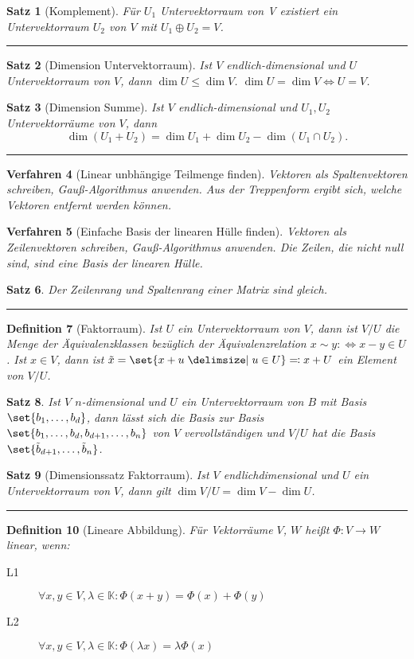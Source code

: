 \documentclass[a4paper]{article}
\newcounter{Sec}
\theoremstyle{marginbreak}
\newtheorem{definition}{Definition}[Sec]
\newtheorem{satz}[definition]{Satz}
\newtheorem{verfahren}[definition]{Verfahren}
\newcommand{\sep}{%
	\rule{\textwidth}{0.3pt}%
	\stepcounter{Sec}%
	}
\begin{document}
	\begin{satz}[Komplement]
		Für $U_1$ Untervektorraum von V existiert ein Untervektorraum $U_2$ von $V$ mit $U_1 \oplus U_2 = V$.
	\end{satz}
	\sep
	\begin{satz}[Dimension Untervektorraum]
		Ist $V$ endlich-dimensional und $U$ Untervektorraum von $V$, dann $\dim U\leq\dim V$.
		$\dim U=\dim V \iff U = V$.
	\end{satz}
	\begin{satz}[Dimension Summe]
		Ist $V$ endlich-dimensional und $U_1, U_2$ Untervektorräume von $V$, dann
		\[\dim(U_1 + U_2) = \dim U_1 + \dim U_2 - \dim(U_1 \cap U_2).\]
	\end{satz}
	\sep
	\begin{verfahren}[Linear unbhängige Teilmenge finden]
		Vektoren als Spaltenvektoren schreiben, Gauß-Algorithmus anwenden.
		Aus der Treppenform ergibt sich, welche Vektoren entfernt werden können.
	\end{verfahren}
	\begin{verfahren}[Einfache Basis der linearen Hülle finden]
		Vektoren als Zeilenvektoren schreiben, Gauß-Algorithmus anwenden.
		Die Zeilen, die nicht null sind, sind eine Basis der linearen Hülle.
	\end{verfahren}
	\begin{satz}
		Der Zeilenrang und Spaltenrang einer Matrix sind gleich.
	\end{satz}
	\sep
	\begin{definition}[Faktorraum]
		Ist $U$ ein Untervektorraum von $V$, dann ist $V/U$ die Menge der Äquivalenzklassen
		bezüglich der Äquivalenzrelation $x\sim y :\Longleftrightarrow x-y\in U$. Ist $x\in V$,
		dann ist $\tilde{x} = \set{x + u \given u\in U} \eqqcolon x + U$ ein Element von
		$V/U$.
	\end{definition}
	\begin{satz}
		Ist $V$ $n$-dimensional und $U$ ein Untervektorraum von $B$ mit Basis
		$\set{b_1,\ldots,b_d}$, dann lässt sich die Basis zur Basis
		$\set{b_1,\ldots,b_d,b_{d+1},\ldots,b_n}$ von $V$ vervollständigen und $V/U$
		hat die Basis $\set{\tilde{b}_{d+1},\ldots,\tilde{b}_n}$.
	\end{satz}
	\begin{satz}[Dimensionssatz Faktorraum]
		Ist $V$ endlichdimensional und $U$ ein Untervektorraum von $V$, dann gilt
		$\dim V/U = \dim V - \dim U$.
	\end{satz}
	\sep
	\begin{definition}[Lineare Abbildung]
		Für Vektorräume $V$, $W$ heißt $\Phi\colon V\to W$ linear, wenn:
		\begin{description}
			\item[L1] $\forall x, y \in V, \lambda\in\mathbb{K}: \Phi(x + y) = \Phi(x) + \Phi(y)$
			\item[L2] $\forall x, y \in V, \lambda\in\mathbb{K}: \Phi(\lambda x) = \lambda\Phi(x)$
		\end{description}
	\end{definition}
\end{document}
